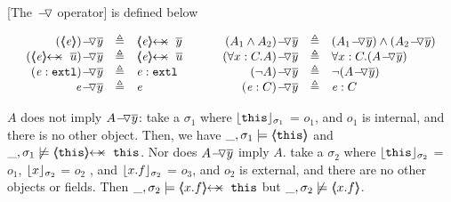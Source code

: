 \begin{definition}
\label{def:push}
[The $\FIXSymbolA$  operator] is  defined below

$
\begin{array}{c}
\begin{array}{l}
\begin{array}{rclcrcl}
  \PushAS y {(\inside \re)} & \triangleq &  \protectedFrom \re {\overline {y} }
  & \ \ \  \ &
  \PushAS y   {(A_1  \wedge  A_2)} & \triangleq &  (\PushAS y  { A_1})  \wedge  ( \PushAS y  {A_2} )  
\\ 
 \PushAS y {(\protectedFrom \re {\overline {u}})} &  \triangleq& \protectedFrom \re {\overline {u}} 
  & &
 \PushAS y  {(\forall x:C.A)} & \triangleq & \forall x:C.({\PushAS y A} )  
  \\  
  \PushAS y  {(\external \re)} &  \triangleq & {\external \re}  %
  & & 
  \PushAS y  {(\neg A)} &  \triangleq & \neg( {\PushAS y A} )  
    \\
     \PushAS y  {\re} &  \triangleq&   \re %
    & &
    \PushAS y  {(\re:C)} &  \triangleq&   \re:C 
 \end{array}
\end{array}
\end{array}
$
\label{f:Push}
\end{definition}

 





\vspace{.1cm}

\begin{example}
\label{push:does:not:imply}
$A$ does not imply $\PushAS {y} {A}$: \Eg  take 
  a   $\sigma_1$ where $\interpret {\sigma_1} {\prg{this}}$ = $o_1$, and $o_1$ is internal,  and there is no other object. Then, we have
$\_,\sigma_1 \models \inside {\prg{this}}$ and $\_,\sigma_1 \not\models \protectedFrom {\prg{this}} {\prg{this}}$.
Nor does  $\PushAS {y} {A}$  imply $A$. \Eg  take a $\sigma_2$ where $\interpret {\sigma_2} {\prg{this}}$ = $o_1$,
 $\interpret {\sigma_2} {x}$ = $o_2$ , and  $\interpret {\sigma_2} {x.f}$ = $o_3$, and $o_2$ is external, and there are no other objects or fields.
 Then $\_,\sigma_2 \models   \protectedFrom {x.f} {\prg{this}}$ but  $\_,\sigma_2 \not\models \inside {x.f}$.
\end{example}

